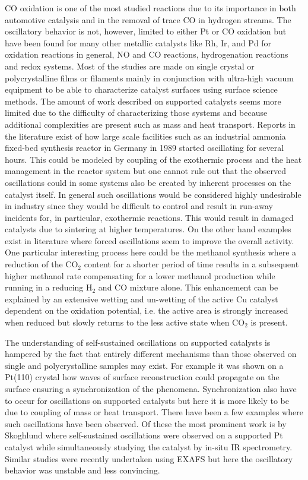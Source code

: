 \documentclass[journal=jacsat,manuscript=article]{achemso}
\begin{document}
CO oxidation is one of the most studied reactions due to its importance in both
automotive catalysis and in the removal of trace CO in hydrogen
streams\cite{IbsBog,Zhang2011}. The oscillatory behavior is not, however, limited to
either Pt or CO oxidation but have been found for many other metallic catalysts
like Rh, Ir, and Pd for oxidation reactions in general, NO and CO reactions,
hydrogenation reactions \cite{Lund2000,SALES1982} and redox
systems\cite{Ibele2010}. Most of the studies
are made on single crystal or polycrystalline films or filaments mainly in
conjunction with ultra-high vacuum equipment to be able to characterize
catalyst surfaces using surface science methods. The amount of work described
on supported catalysts seems more limited due to the difficulty of
characterizing those systems and because additional complexities are present
such as mass and heat transport\cite{Meunier2008}. Reports in the literature
exist of how large
scale facilities such as an industrial ammonia fixed-bed synthesis reactor in
Germany in 1989 started oscillating for several hours. This could be modeled by
coupling of the exothermic process and the heat management in the reactor
system \cite{Morud1998} but one cannot rule out that the observed oscillations
could in some systems also be created by inherent processes on the catalyst
itself. In general such oscillations would be considered highly undesirable in
industry since they would be difficult to control and result in run-away
incidents for, in particular, exothermic reactions. This would result in
damaged catalysts due to sintering at higher temperatures. On the other hand
examples exist in literature where forced oscillations seem to improve the
overall activity\cite{IMBIHL1995,Machado2005}. One particular interesting
process here could be the methanol synthesis where a reduction of the CO$_2$
content for a shorter period of time results in a subsequent higher methanol
rate compensating for a lower methanol production while running in a
reducing H$_2$ and CO mixture alone\cite{Dynamics-Bog}. This enhancement can
be explained by an extensive wetting and un-wetting of the active Cu catalyst
dependent on the oxidation potential\cite{Hansen2002}, i.e. the active area is
strongly increased when reduced but slowly returns to the less active state
when CO$_2$ is present.

The understanding of self-sustained oscillations on supported
catalysts is hampered by the fact that entirely different mechanisms than those
observed on single and polycrystalline samples may exist. For example it was
shown on a Pt(110) crystal how waves of surface reconstruction could propagate
on the surface ensuring a synchronization of the phenomena. Synchronization also have to
occur for oscillations on supported catalysts but here it is more likely to be
due to coupling of mass or heat transport. There have been a few examples where
such oscillations have been observed. Of these the most prominent work is by
Skoghlund\cite{Carlsson2006} where self-sustained oscillations were observed on
a supported Pt catalyst while simultaneously studying the catalyst by in-situ
IR spectrometry. Similar studies were recently undertaken using EXAFS
\cite{Singh2010} but here the oscillatory behavior was unstable and less
convincing.
\end{document}
